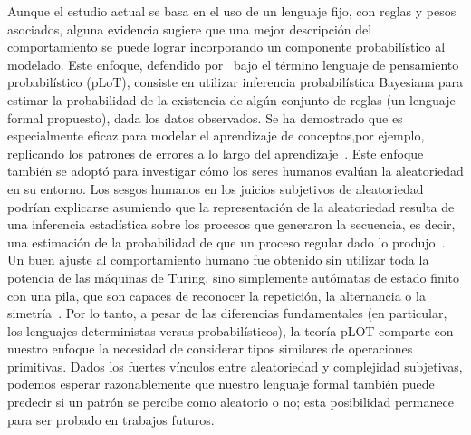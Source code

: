 Aunque el estudio actual se basa en el uso de un lenguaje fijo, con reglas y pesos asociados, alguna evidencia sugiere que una mejor descripción del comportamiento se puede lograr incorporando un componente probabilístico al modelado. Este enfoque, defendido por~\cite{piantadosi2016four} bajo el término lenguaje de pensamiento probabilístico (pLoT), consiste en utilizar inferencia probabilística Bayesiana para estimar la probabilidad de la existencia de algún conjunto de reglas (un lenguaje formal propuesto), dada los datos observados. Se ha demostrado que es especialmente eficaz para modelar el aprendizaje de conceptos,por ejemplo, replicando los patrones de errores a lo largo del aprendizaje~\cite{goodman2008rational,piantadosi2012bootstrapping,piantadosi2016logical}. Este enfoque también se adoptó para investigar cómo los seres humanos evalúan la aleatoriedad en su entorno. Los sesgos humanos en los juicios subjetivos de aleatoriedad~\cite{f114,f115} podrían explicarse asumiendo que la representación de la aleatoriedad resulta de una inferencia estadística sobre los procesos que generaron la secuencia, es decir, una estimación de la probabilidad de que un proceso regular dado lo produjo~\cite{f21}. Un buen ajuste al comportamiento humano fue obtenido sin utilizar toda la potencia de las máquinas de Turing, sino simplemente autómatas de estado finito con una pila, que son capaces de reconocer la repetición, la alternancia o la simetría~\cite{f18,f117}. Por lo tanto, a pesar de las diferencias fundamentales (en particular, los lenguajes deterministas versus probabilísticos), la teoría pLOT comparte con nuestro enfoque la necesidad de considerar tipos similares de operaciones primitivas. Dados los fuertes vínculos entre aleatoriedad y complejidad subjetivas, podemos esperar razonablemente que nuestro lenguaje formal también puede predecir si un patrón se percibe como aleatorio o no; esta posibilidad permanece para ser probado en trabajos futuros.

